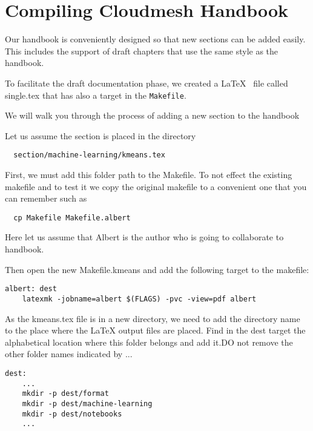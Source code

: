 
\section{Compiling Cloudmesh Handbook}\label{s:help-compile-handbook}

Our handbook is conveniently designed so that new sections can be
added easily. This includes the support of draft chapters that use the
same style as the handbook.

To facilitate the draft documentation phase, we created a \LaTeX~ file
called single.tex that has also a target in the \verb|Makefile|.

We will walk you through the process of adding a new section to the handbook

Let us assume the section is placed in the directory

\begin{lstlisting}
  section/machine-learning/kmeans.tex 
\end{lstlisting}

First, we must add this folder path to the Makefile. To not effect the
existing makefile and to test it we copy the original makefile to a
convenient one that you can remember such as

\begin{lstlisting}
  cp Makefile Makefile.albert
\end{lstlisting}

Here let us assume that Albert is the author who is going to
collaborate to handbook.

Then open the new Makefile.kmeans and add the following target to the
makefile:

\begin{lstlisting}
albert: dest 
	latexmk -jobname=albert $(FLAGS) -pvc -view=pdf albert
\end{lstlisting}  

As the kmeans.tex file is in a new directory, we need to add the
directory name to the place where the LaTeX output files are placed.
Find in the dest target the alphabetical location where  this folder
belongs and add it.DO not remove the other folder names indicated by
...


\begin{lstlisting}
dest:
    ...
    mkdir -p dest/format
    mkdir -p dest/machine-learning
    mkdir -p dest/notebooks
    ...
\end{lstlisting}

